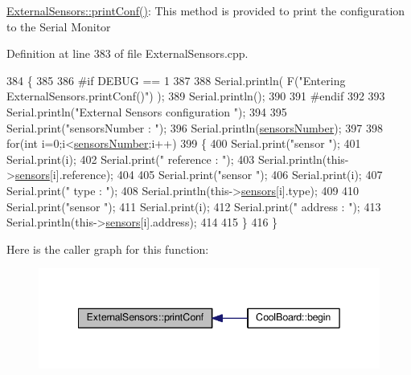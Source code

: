 \hyperlink{class_external_sensors_a78c2bf55084435dd51d3c559b2d3c6f3}{External\+Sensors\+::print\+Conf()}\+: This method is provided to print the configuration to the Serial Monitor 

Definition at line 383 of file External\+Sensors.\+cpp.


\begin{DoxyCode}
384 \{
385 
386 \textcolor{preprocessor}{#if DEBUG == 1}
387 
388     Serial.println( F(\textcolor{stringliteral}{"Entering ExternalSensors.printConf()"}) );
389     Serial.println();
390 
391 \textcolor{preprocessor}{#endif }
392 
393     Serial.println(\textcolor{stringliteral}{"External Sensors configuration "});
394 
395     Serial.print(\textcolor{stringliteral}{"sensorsNumber : "});
396     Serial.println(\hyperlink{class_external_sensors_a58e4fbf9adeae787d92be5fa33043b5d}{sensorsNumber});
397 
398     \textcolor{keywordflow}{for}(\textcolor{keywordtype}{int} i=0;i<\hyperlink{class_external_sensors_a58e4fbf9adeae787d92be5fa33043b5d}{sensorsNumber};i++)
399     \{
400         Serial.print(\textcolor{stringliteral}{"sensor "});
401         Serial.print(i);
402         Serial.print(\textcolor{stringliteral}{" reference : "});
403         Serial.println(this->\hyperlink{class_external_sensors_a284233f884fcf00154a44740cf1d9e1e}{sensors}[i].reference);
404 
405         Serial.print(\textcolor{stringliteral}{"sensor "});
406         Serial.print(i);
407         Serial.print(\textcolor{stringliteral}{" type : "});
408         Serial.println(this->\hyperlink{class_external_sensors_a284233f884fcf00154a44740cf1d9e1e}{sensors}[i].type);
409                 
410         Serial.print(\textcolor{stringliteral}{"sensor "});
411         Serial.print(i);
412         Serial.print(\textcolor{stringliteral}{" address : "});
413         Serial.println(this->\hyperlink{class_external_sensors_a284233f884fcf00154a44740cf1d9e1e}{sensors}[i].address);
414     
415     \}
416 \}
\end{DoxyCode}
Here is the caller graph for this function\+:\nopagebreak
\begin{figure}[H]
\begin{center}
\leavevmode
\includegraphics[width=342pt]{d1/d2f/class_external_sensors_a78c2bf55084435dd51d3c559b2d3c6f3_icgraph}
\end{center}
\end{figure}
\mbox{\label{class_external_sensors_a53177b81eca3be89508b5511ddcd00fc}} 
